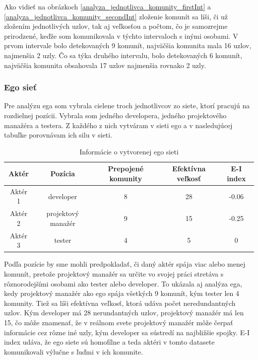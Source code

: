 \documentclass[slovak,master,public,dept460,male,cpdeclaration,oneside]{diploma}
\begin{document}
Ako vidieť na obrázkoch \ref{analyza_jednotlivca_komunity_firstInt} a \ref{analyza_jednotlivca_komunity_secondInt} zloženie komunít sa líši, či už zložením jednotlivých uzlov, tak aj veľkosťou a počtom, čo je samozrejme prirodzené, keďže som komunikovala v týchto intervaloch s inými osobami. V prvom intervale bolo detekovaných 9 komunít, najväčšia komunita mala 16 uzlov, najmenšia 2 uzly. Čo sa týka druhého intervalu, bolo detekovaných 6 komunít, najväčšia komunita obsahovala 17 uzlov najmenšia rovnako 2 uzly.


\subsubsection{Ego sieť}
Pre analýzu ega som vybrala cielene troch jednotlivcov zo siete, ktorí pracujú na rozdielnej pozícii. Vybrala som jedného developera, jedného projektového manažéra a testera. Z každého z nich vytváram v sieti ego a v nasledujúcej tabuľke porovnávam ich silu v sieti.

\begin{table}[h!]
\centering
\begin{tabular}{ |c|c|c|c|c| }
 \hline
 Aktér & Pozícia & Prepojené komunity & Efektívna veľkosť & E-I index \\ 
 \hline
 Aktér 1  & developer  & 8  & 28  &  -0.06 \\  
  \hline
  Aktér 2 &  projektový manažér  &  9 & 15 & -0.25  \\ 
  \hline
  Aktér 3 & tester   &  4 &  5 & 0  \\ 
  \hline

\end{tabular}
\caption{Informácie o vytvorenej ego sieti}
\end{table} 

Podľa pozície by sme mohli predpokladať, či daný aktér spája viac alebo menej komunít, pretože projektový manažér sa určite vo svojej práci stretáva s rôznorodejšími osobami ako tester alebo developer. To ukázala aj analýza ega, kedy projektový manažér ako ego spája všetkých 9 komunít, kým tester len 4 komunity. Tiež sa líši efektívna veľkosť, ktorá udáva počet neredundantných uzlov. Kým developer má 28 nerundantných uzlov, projektový manažér má len 15, čo môže znamenať, že v reálnom svete projektový manažér môže čerpať informácie cez rôzne iné uzly, kým developer sa sústredí na najbližšie spojky. E-I index udáva, že ego siete sú homofílne a teda aktéri v tomto datasete komunikovali výlučne s ľuďmi v ich komunite.
\end{document}

